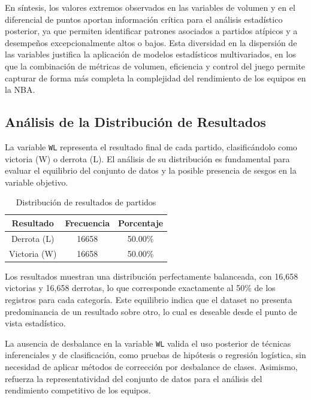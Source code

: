 \documentclass[12pt]{article}
\begin{document}
En síntesis, los valores extremos observados en las variables de volumen y en el diferencial de
puntos aportan información crítica para el análisis estadístico posterior, ya que permiten
identificar patrones asociados a partidos atípicos y a desempeños excepcionalmente altos o bajos.
Esta diversidad en la dispersión de las variables justifica la aplicación de modelos estadísticos
multivariados, en los que la combinación de métricas de volumen, eficiencia y control del juego
permite capturar de forma más completa la complejidad del rendimiento de los equipos en la NBA.


\subsection{Análisis de la Distribución de Resultados}
\label{subsec:distribucion-resultados}

La variable \texttt{WL} representa el resultado final de cada partido, clasificándolo como
victoria (W) o derrota (L). El análisis de su distribución es fundamental para evaluar el
equilibrio del conjunto de datos y la posible presencia de sesgos en la variable objetivo.

\begin{table}[H]
\centering
\caption{Distribución de resultados de partidos}
\label{tab:distribucion_wl}
\begin{tabular}{|c|c|c|}
\hline
\textbf{Resultado} & \textbf{Frecuencia} & \textbf{Porcentaje} \\
\hline
Derrota (L) & 16658 & 50.00\% \\
Victoria (W) & 16658 & 50.00\% \\
\hline
\end{tabular}
\end{table}

Los resultados muestran una distribución perfectamente balanceada, con 16,658 victorias
y 16,658 derrotas, lo que corresponde exactamente al 50\% de los registros para cada
categoría. Este equilibrio indica que el dataset no presenta predominancia de un resultado
sobre otro, lo cual es deseable desde el punto de vista estadístico.

La ausencia de desbalance en la variable \texttt{WL} valida el uso posterior de técnicas
inferenciales y de clasificación, como pruebas de hipótesis o regresión logística, sin
necesidad de aplicar métodos de corrección por desbalance de clases. Asimismo, refuerza la
representatividad del conjunto de datos para el análisis del rendimiento competitivo de
los equipos.
\end{document}
